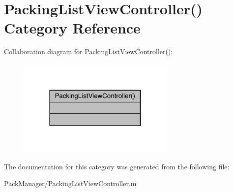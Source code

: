 \hypertarget{category_packing_list_view_controller_07_08}{\section{Packing\-List\-View\-Controller() Category Reference}
\label{category_packing_list_view_controller_07_08}
}


Collaboration diagram for Packing\-List\-View\-Controller()\-:\nopagebreak
\begin{figure}[H]
\begin{center}
\leavevmode
\includegraphics[width=218pt]{category_packing_list_view_controller_07_08__coll__graph}
\end{center}
\end{figure}


The documentation for this category was generated from the following file\-:\begin{DoxyCompactItemize}
\item 
Pack\-Manager/Packing\-List\-View\-Controller.\-m\end{DoxyCompactItemize}

